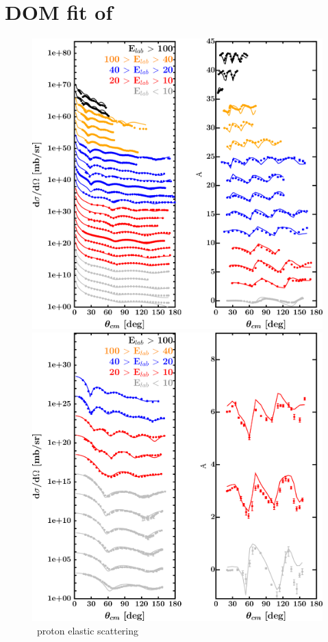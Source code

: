 \section{DOM fit of \niEight}
\label{ni58DOMOutput}
\begin{figure}[hbtp]
    \centering
    \begin{minipage}{0.47\textwidth}
        \centering
        \includegraphics[width=\textwidth]{figures/ni58_protonElastic.png}
        \caption*{\niEight\ proton elastic scattering}
        \label{DOMFitData_ni58_proton_elastic}
    \end{minipage}\hspace{6pt}
    \begin{minipage}{0.47\textwidth}
        \centering
        \includegraphics[width=\textwidth]{figures/ni58_neutronElastic.png}

\end{minipage}
\end{figure}
